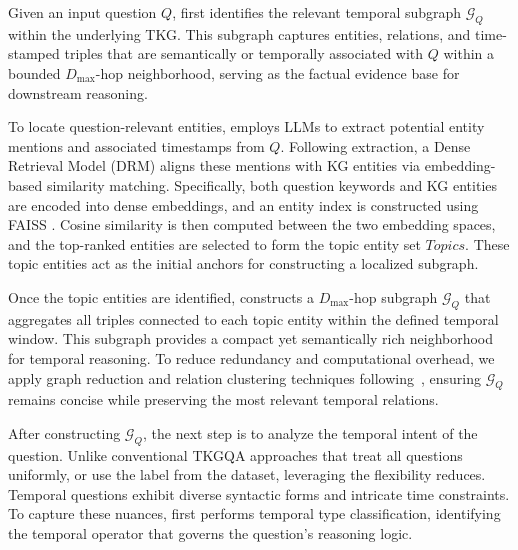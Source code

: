 Given an input question $Q$, \mot first identifies the relevant temporal subgraph $\mathcal{G}_Q$ within the underlying TKG.  
This subgraph captures entities, relations, and time-stamped triples that are semantically or temporally associated with $Q$ within a bounded $D_{\max}$-hop neighborhood, 
serving as the factual evidence base for downstream reasoning.

To locate question-relevant entities, \mot employs LLMs to extract potential entity mentions and associated timestamps from $Q$.  
Following extraction, a Dense Retrieval Model (DRM) aligns these mentions with KG entities via embedding-based similarity matching.  
Specifically, both question keywords and KG entities are encoded into dense embeddings, and an entity index is constructed using FAISS \cite{douze2024faiss}.  
Cosine similarity is then computed between the two embedding spaces, and the top-ranked entities are selected to form the topic entity set $Topics$.  
These topic entities act as the initial anchors for constructing a localized subgraph.

Once the topic entities are identified, \mot constructs a $D_{\max}$-hop subgraph $\mathcal{G}_Q$ that aggregates all triples connected to each topic entity within the defined temporal window.  
This subgraph provides a compact yet semantically rich neighborhood for temporal reasoning.  
To reduce redundancy and computational overhead, we apply graph reduction and relation clustering techniques following~\cite{pogtan2025paths}, ensuring $\mathcal{G}_Q$ remains concise while preserving the most relevant temporal relations.  

After constructing $\mathcal{G}_Q$, the next step is to analyze the temporal intent of the question.  
Unlike conventional TKGQA approaches that treat all questions uniformly, or use the label from the dataset, leveraging the flexibility reduces. Temporal questions exhibit diverse syntactic forms and intricate time constraints.  
To capture these nuances, \mot first performs {temporal type classification}, identifying the temporal operator that governs the question’s reasoning logic.

